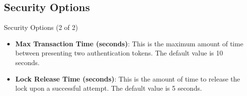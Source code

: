 \subsection{Security Options}
\begin{frame}{Security Options (2 of 2)}
\begin{itemize}
    \item<1-> \textbf{Max Transaction Time (seconds)}: This is the maximum amount of time between presenting two authentication tokens. The default value is 10 seconds.
    \item<2-> \textbf{Lock Release Time (seconds)}: This is the amount of time to release the lock upon a successful attempt. The default value is 5 seconds.
\end{itemize}
\end{frame}
